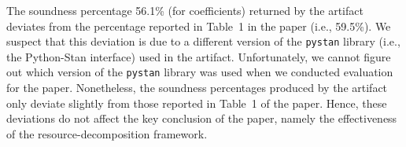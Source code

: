 The soundness percentage 56.1\% (for coefficients) returned by the artifact
deviates from the percentage reported in Table~1 in the paper (i.e., 59.5\%).
%
We suspect that this deviation is due to a different version of the
\texttt{pystan} library (i.e., the Python-Stan interface) used in the
artifact.
%
Unfortunately, we cannot figure out which version of the \texttt{pystan} library
was used when we conducted evaluation for the paper.
%
Nonetheless, the soundness percentages produced by the artifact only deviate
slightly from those reported in Table~1 of the paper.
%
Hence, these deviations do not affect the key conclusion of the paper, namely
the effectiveness of the resource-decomposition framework.
